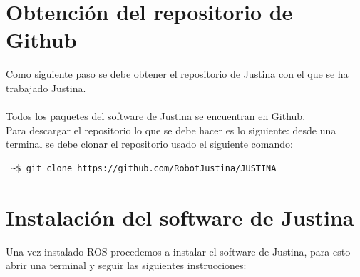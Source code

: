 \documentclass[user_manual.tex]{subfiles}
\begin{document}
 \section{Obtención del repositorio de Github}
 Como siguiente paso se debe obtener el repositorio de Justina con el que se ha trabajado Justina.\\
 \\
 Todos los paquetes del software de Justina se encuentran en Github.\\
Para descargar el repositorio lo que se debe hacer es lo siguiente: desde una terminal se debe clonar el repositorio  usado el siguiente comando:\\

\begin{verbatim}
 ~$ git clone https://github.com/RobotJustina/JUSTINA
\end{verbatim}
 
\section{Instalación del software de Justina}
Una vez instalado ROS procedemos a instalar el software de Justina, para esto abrir una terminal y seguir las siguientes instrucciones:
\end{document}
